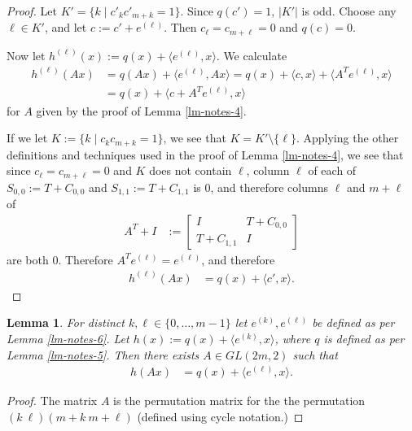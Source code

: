 \documentclass[12pt,a4paper]{article}
\newcommand{\abs}[1]{\left| #1 \right|}
\newtheorem{Lemma}{Lemma}
\begin{document}
\begin{proof}
Let $K'=\{k \mid c'_k c'_{m+k} = 1\}$. Since $q(c')=1$, $\abs{K'}$ is odd.
Choose any $\ell \in K'$, and let $c := c' + e^{(\ell)}$.
Then $c_{\ell} = c_{m+\ell} = 0$ and $q(c)=0$.

Now let $h^{(\ell)}(x) := q(x) + \langle e^{(\ell)}, x \rangle$.
We calculate
\begin{align*}
h^{(\ell)}(A x)
&=
q(A x) + \langle e^{(\ell)}, A x \rangle
=
q(x) + \langle c, x \rangle + \langle A^T e^{(\ell)}, x \rangle
\\
&=
q(x) + \langle c + A^T e^{(\ell)}, x \rangle
\end{align*}
for $A$ given by the proof of Lemma \ref{lm-notes-4}.

If we let $K := \{ k \mid c_k c_{m+k} = 1 \}$, we see that $K = K' \setminus \{\ell\}$.
Applying the other definitions and techniques used in the proof of Lemma \ref{lm-notes-4},
we see that since $c_{\ell} = c_{m+\ell} = 0$ and $K$ does not contain $\ell$,
column $\ell$ of each of $S_{0,0} := T + C_{0,0}$
and $S_{1,1} := T + C_{1,1}$ is $0$, and therefore columns $\ell$ and $m + \ell$ of
\begin{align*}
A^T + I
&:=
\left[
\begin{array}{cc}
I & T + C_{0,0}
\\
T + C_{1,1} & I
\end{array}
\right]
\end{align*}
are both $0$.
Therefore $A^T e^{(\ell)} = e^{(\ell)}$, and therefore
\begin{align*}
h^{(\ell)}(A x)
&=
q(x) + \langle c', x \rangle.
\end{align*}

\end{proof}

\begin{Lemma}
\label{lm-notes-6-b}
For distinct $k,\ell \in \{0,\ldots,m-1\}$ let $e^{(k)}, e^{(\ell)}$ be defined as per Lemma
\ref{lm-notes-6}.
Let $h(x) := q(x) + \langle e^{(k)}, x \rangle$, where $q$ is defined as per Lemma \ref{lm-notes-5}.
Then there exists $A \in GL(2 m, 2)$ such that
\begin{align}
h(A x)
&=
q(x) + \langle e^{(\ell)},x \rangle.
\end{align}
\end{Lemma}

\begin{proof}
The matrix $A$ is the permutation matrix for the the permutation $(k\ \ell)(m+k\ m+\ell)$ (defined
using cycle notation.)
\end{proof}
\end{document}
